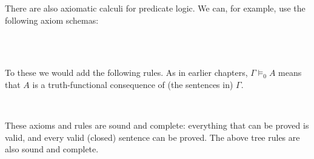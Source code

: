 There are also axiomatic calculi for predicate logic. We can, for example, use
the following axiom schemas:
%
\begin{principles}
  \\
  \\
\end{principles}
%
To these we would add the following rules. As in earlier chapters, $\Gamma \models_{0} A$ means that $A$ is a truth-functional consequence of (the sentences in) $\Gamma$.
\begin{principles}
  \\
\end{principles}


These axioms and rules are sound and complete: everything that can be proved is valid, and
every valid (closed) sentence can be proved. The above tree rules are also sound
and complete.


